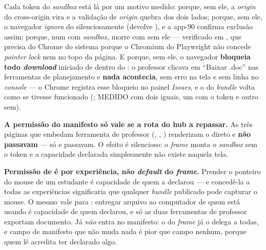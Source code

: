 \begin{nota}
Cada token do \emph{sandbox} está lá por um motivo medido:
 porque, sem ele, a \emph{origin} do 
cross-origin vira  e a validação de \emph{origin} quebra dos dois
lados;  porque, sem ele, o navegador \emph{ignora}
 do  silenciosamente (devolve ), e a app-90
confirma exclusão assim;  porque, num  com
\emph{sandbox},  morre com  sem ele
--- verificado em , que precisa do Chrome do
sistema porque o Chromium do Playwright não concede \emph{pointer lock} nem no
topo da página. E  porque, sem ele, o navegador
\textbf{bloqueia todo \emph{download}} iniciado de dentro do : o
professor clicava em \enquote{Baixar .doc} nas ferramentas de planejamento e
\textbf{nada acontecia}, sem erro na tela e sem linha no \emph{console} --- o
Chrome registra esse bloqueio no painel \emph{Issues}, e o  do
\emph{bundle} volta como se tivesse funcionado (;
MEDIDO com dois  iguais, um com o token e outro sem).
\end{nota}

\begin{atencao}
\textbf{A permissão do manifesto só vale se a rota do hub a repassar.} As três
páginas que embedam ferramenta de professor
(, , )
renderizam o  direto e \textbf{não passavam } ---
só  e  passavam. O efeito é silencioso: o
\emph{frame} monta o \emph{sandbox} sem o token e a capacidade declarada
simplesmente não existe naquela tela.
\end{atencao}

\begin{decisao}
\textbf{Permissão de  é por experiência, não \emph{default} do
\emph{frame}.} Prender o ponteiro do mouse de um estudante é capacidade de quem a
declarou --- e concedê-la a todas as experiências significaria que qualquer
\emph{bundle} publicado pode capturar o mouse. O mesmo vale para
: entregar arquivo ao computador de quem está usando é
capacidade de quem declarou, e só as duas ferramentas de professor exportam
documento. Já 
\emph{não} entra no manifesto: o  do \emph{frame} já o delega a todas,
e campo de manifesto que não muda nada é pior que campo nenhum, porque quem lê
acredita ter declarado algo.
\end{decisao}

